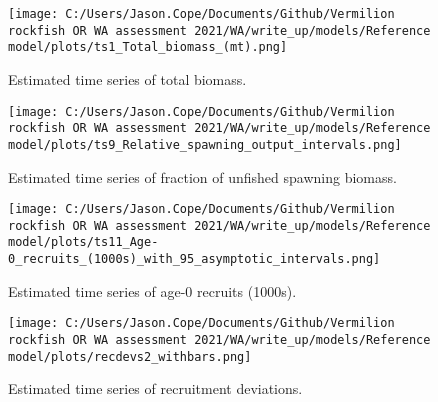 \documentclass[11pt,
  english,
  a4paper,
]{article}
\begin{document}
\tagmcend\tagstructend


\begin{figure}
\centering
\texttt{[image: C:/Users/Jason.Cope/Documents/Github/Vermilion rockfish OR WA assessment 2021/WA/write\_up/models/Reference model/plots/ts1\_Total\_biomass\_(mt).png]}
\caption{Estimated time series of total biomass.\label{fig:tot-bio}}
\end{figure}

\tagmcend\tagstructend


\begin{figure}
\centering
\texttt{[image: C:/Users/Jason.Cope/Documents/Github/Vermilion rockfish OR WA assessment 2021/WA/write\_up/models/Reference model/plots/ts9\_Relative\_spawning\_output\_intervals.png]}
\caption{Estimated time series of fraction of unfished spawning biomass.\label{fig:depl}}
\end{figure}

\tagmcend\tagstructend


\begin{figure}
\centering
\texttt{[image: C:/Users/Jason.Cope/Documents/Github/Vermilion rockfish OR WA assessment 2021/WA/write\_up/models/Reference model/plots/ts11\_Age-0\_recruits\_(1000s)\_with\_95\_asymptotic\_intervals.png]}
\caption{Estimated time series of age-0 recruits (1000s).\label{fig:recruits}}
\end{figure}

\tagmcend\tagstructend


\begin{figure}
\centering
\texttt{[image: C:/Users/Jason.Cope/Documents/Github/Vermilion rockfish OR WA assessment 2021/WA/write\_up/models/Reference model/plots/recdevs2\_withbars.png]}
\caption{Estimated time series of recruitment deviations.\label{fig:rec-devs}}
\end{figure}
\end{document}

